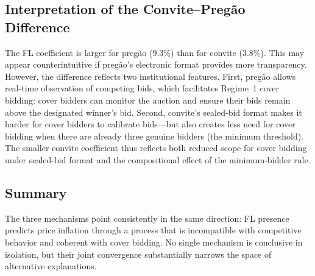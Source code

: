 \subsection{Interpretation of the Convite--Preg\~ao Difference}

The FL coefficient is larger for preg\~ao (9.3\%) than for convite
(3.8\%). This may appear counterintuitive if preg\~ao's electronic
format provides more transparency. However, the difference reflects
two institutional features. First, preg\~ao allows real-time observation
of competing bids, which facilitates Regime~1 cover bidding: cover
bidders can monitor the auction and ensure their bids remain above the
designated winner's bid. Second, convite's sealed-bid format makes it
harder for cover bidders to calibrate bids---but also creates less need
for cover bidding when there are already three genuine bidders (the
minimum threshold). The smaller convite coefficient thus reflects both
reduced scope for cover bidding under sealed-bid format and the
compositional effect of the minimum-bidder rule.

\subsection{Summary}

The three mechanisms point consistently in the same direction: FL
presence predicts price inflation through a process that is incompatible
with competitive behavior and coherent with cover bidding. No single
mechanism is conclusive in isolation, but their joint convergence
substantially narrows the space of alternative explanations.

